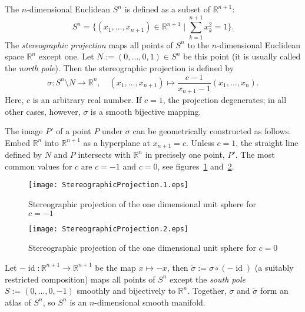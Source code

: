 \documentclass[12pt]{article}
\newcommand{\Sum}{\sum\limits}
\newcommand{\mbb}{\mathbb}
\DeclareMathOperator{\id}{id}
\begin{document}
The $n$-dimensional Euclidean  $S^n$ is
defined as a subset
of $\mbb{R}^{n+1}$:
\begin{equation*}
S^n=\biggl\{(x_1,\ldots,x_{n+1})\in\mbb{R}^{n+1}\mid\Sum_{k=1}^{n+1}x_k^2=1\biggr\}.
\end{equation*}
The \emph{stereographic projection} maps all points of $S^n$ to
the $n$-dimensional Euclidean space $\mbb{R}^n$ except one. Let
$N:=(0,\ldots,0,1)\in S^n$ be this point (it is usually called the
\emph{north pole}). Then the stereographic projection is defined by
\begin{equation*}
\sigma\colon S^n\setminus
N\to\mbb{R}^n,\quad(x_1,\ldots,x_{n+1})\mapsto\frac{c-1}{x_{n+1}-1}(x_1,\ldots,x_n).
\end{equation*}
Here, $c$ is an arbitrary real number. If $c=1$, the projection
degenerates; in all other cases, however, $\sigma$ is a smooth
bijective mapping.

The image $P'$ of a point $P$ under $\sigma$ can be geometrically
constructed as follows. Embed $\mbb{R}^n$ into
$\mbb{R}^{n+1}$ as a hyperplane at $x_{n+1}=c$. Unless $c=1$, the
straight line defined by $N$ and $P$ intersects with $\mbb{R}^n$ in
precisely one point, $P'$. The most common values for $c$ are $c=-1$
and $c=0$, see figures~\ref{fig1} and~\ref{fig2}.

\begin{figure}
\label{fig1}
\begin{center}
\texttt{[image: StereographicProjection.1.eps]}
\end{center}
\sf\caption{Stereographic projection of the one dimensional unit
sphere for $c=-1$}
\end{figure}

\begin{figure}
\label{fig2}
\begin{center}
\texttt{[image: StereographicProjection.2.eps]}
\end{center}
\sf\caption{Stereographic projection of the one dimensional unit
sphere for $c=0$}
\end{figure}

Let $-\id\colon\mbb{R}^{n+1}\to\mbb{R}^{n+1}$ be the map $x\mapsto
-x$, then $\tilde{\sigma}:=\sigma\circ(-\id)$ (a suitably restricted composition) maps all points of $S^n$
except the \emph{south pole} $S:=(0,\ldots,0,-1)$ smoothly and
bijectively to $\mbb{R}^n$. Together, $\sigma$ and $\tilde{\sigma}$
form an atlas of $S^n$, so $S^n$ is an $n$-dimensional smooth
manifold.
\end{document}
